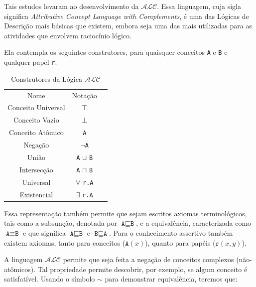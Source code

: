 Tais estudos levaram ao desenvolvimento da $\mathcal{ALC}$. Essa linguagem, cuja sigla significa \textit{Attributive Concept Language with Complements}, é uma das Lógicas de Descrição mais básicas que existem, embora seja uma das mais utilizadas para as atividades que envolvem raciocínio lógico. 

Ela contempla os seguintes construtores, para quaisquer conceitos \texttt{A} e \texttt{B} e qualquer papel \texttt{r}:

\begin{table}[H]
	\centering
	\begin{tabular}{|c|c|l}
		\cline{1-2}
		Nome               & Notação                          &  \\ \cline{1-2}
		Conceito Universal & $ \top $                         &  \\ \cline{1-2}
		Conceito Vazio     & $ \bot $                         &  \\ \cline{1-2}
		Conceito Atômico   & \texttt{A}                       &  \\ \cline{1-2}
		Negação            & $ \neg $\texttt{A}               &  \\ \cline{1-2}
		União              & \texttt{A} $ \sqcup $ \texttt{B} &  \\ \cline{1-2}
		Intersecção        & \texttt{A} $ \sqcap $ \texttt{B} &  \\ \cline{1-2}
		Universal          & $\forall$ \texttt{r.A}           &  \\ \cline{1-2}
		Existencial        & $\exists$ \texttt{r.A}           &  \\ \cline{1-2}
	\end{tabular}
	\caption{Construtores da Lógica $ \mathcal{ALC} $}
\end{table}

Essa representação também permite que sejam escritos axiomas terminológicos, tais como a subsunção, denotada por $ \texttt{A} \sqsubseteq \texttt{B} $, e a equivalência, caracterizada como $ \texttt{A} \equiv \texttt{B} $ e que significa $ \texttt{A} \sqsubseteq \texttt{B} $ e $ \texttt{B} \sqsubseteq \texttt{A} $. Para o conhecimento assertivo também existem axiomas, tanto para conceitos ($\texttt{A}(x)$), quanto para papéis ($\texttt{r}(x,y)$).

A linguagem $\mathcal{ALC}$ permite que seja feita a negação de conceitos complexos (não-atômicos). Tal propriedade permite descobrir, por exemplo, se algum conceito é satisfatível. Usando o símbolo $ \sim $ para demonstrar equivalência, teremos que:


